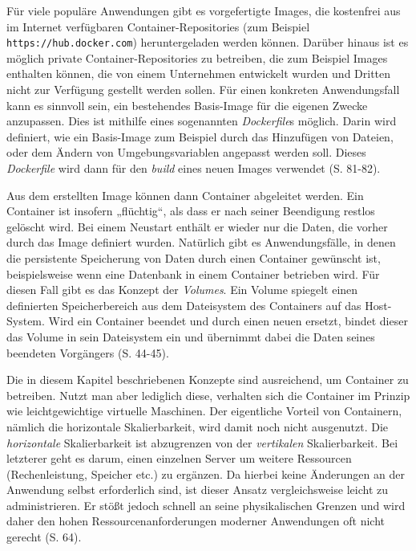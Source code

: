 \documentclass[11pt,a4paper]{article}
\begin{document}
Für viele populäre Anwendungen gibt es vorgefertigte Images, die kostenfrei aus im Internet verfügbaren
Container-Repositories (zum Beispiel \lstinline|https://hub.docker.com|) heruntergeladen werden können.
Darüber hinaus ist es möglich private Container-Repositories zu betreiben,
die zum Beispiel Images enthalten können, die von einem Unternehmen entwickelt wurden
und Dritten nicht zur Verfügung gestellt werden sollen.
Für einen konkreten Anwendungsfall kann es sinnvoll sein, ein bestehendes Basis-Image für die eigenen Zwecke anzupassen.
Dies ist mithilfe eines sogenannten \emph{Dockerfile}s möglich. Darin wird definiert, wie ein Basis-Image
zum Beispiel durch das Hinzufügen von Dateien,
oder dem Ändern von Umgebungsvariablen angepasst werden soll. Dieses \emph{Dockerfile} wird dann für den \emph{build}
eines neuen Images verwendet \cite{kofler2021docker} (S. 81-82).

Aus dem erstellten Image können dann Container abgeleitet werden. Ein Container ist insofern „flüchtig“, als dass er nach seiner
Beendigung restlos gelöscht wird. Bei einem Neustart enthält er wieder nur die Daten, die vorher durch das Image definiert wurden.
Natürlich gibt es Anwendungsfälle, in denen die persistente Speicherung von Daten durch einen Container gewünscht ist,
beispielsweise wenn
eine Datenbank in einem Container betrieben wird. Für diesen Fall gibt es das Konzept der \emph{Volumes}.
Ein Volume spiegelt einen definierten Speicherbereich aus dem Dateisystem des Containers auf das Host-System.
Wird ein Container beendet und durch einen neuen ersetzt, bindet dieser das Volume in sein Dateisystem ein und übernimmt
dabei die Daten seines beendeten Vorgängers \cite{kofler2021docker} (S. 44-45).

Die in diesem Kapitel beschriebenen Konzepte sind ausreichend, um Container zu betreiben.
Nutzt man aber lediglich diese, verhalten sich die Container im Prinzip wie leichtgewichtige virtuelle Maschinen.
Der eigentliche Vorteil von Containern, nämlich die horizontale Skalierbarkeit, wird damit noch nicht ausgenutzt.
Die \emph{horizontale} Skalierbarkeit ist abzugrenzen von der \emph{vertikalen} Skalierbarkeit.
Bei letzterer geht es darum, einen einzelnen Server um weitere Ressourcen (Rechenleistung, Speicher etc.) zu ergänzen.
Da hierbei keine Änderungen an der Anwendung selbst erforderlich sind, ist dieser Ansatz vergleichsweise leicht
zu administrieren. Er stößt jedoch schnell an seine physikalischen Grenzen und wird daher den hohen
Ressourcenanforderungen moderner Anwendungen oft nicht gerecht \cite{Schmeling_Dargatz_2022} (S. 64).
\end{document}

